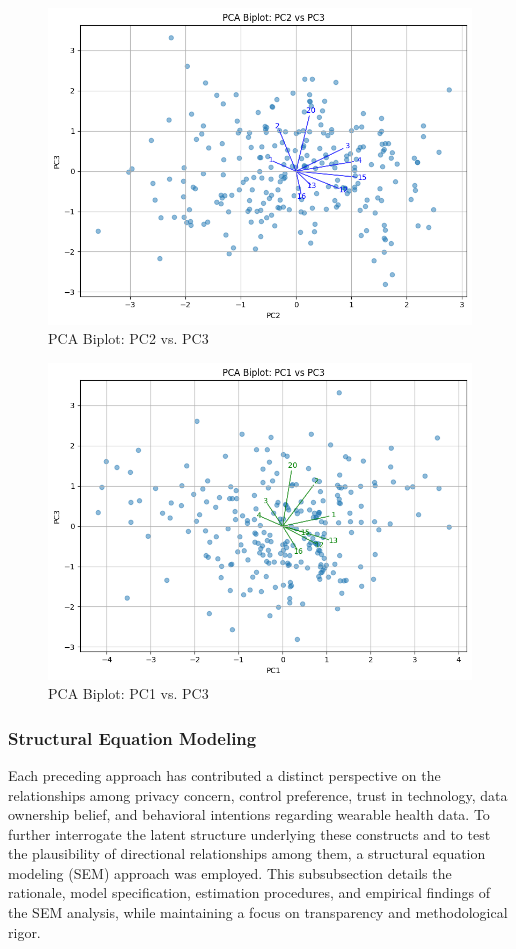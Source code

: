 	\begin{figure}[ht]\centering
		\includegraphics[width=0.7\linewidth]{figures/img/factor_analysis/pca_biplot_pc2_vs_pc3.png}
		\caption{PCA Biplot: PC2 vs. PC3}
		\label{fig:pca_biplot_pc2_vs_pc3}
	\end{figure}
	\begin{figure}[ht]\centering
		\includegraphics[width=0.7\linewidth]{figures/img/factor_analysis/pca_biplot_pc1_vs_pc3.png}
		\caption{PCA Biplot: PC1 vs. PC3}
		\label{fig:pca_biplot_pc1_vs_pc3}
	\end{figure}
	\subsubsection{Structural Equation Modeling}
		Each preceding approach has contributed a distinct perspective on the relationships among privacy concern, control preference, trust in technology, data ownership belief, and behavioral intentions regarding wearable health data. To further interrogate the latent structure underlying these constructs and to test the plausibility of directional relationships among them, a structural equation modeling (SEM) approach was employed. This subsubsection details the rationale, model specification, estimation procedures, and empirical findings of the SEM analysis, while maintaining a focus on transparency and methodological rigor.


